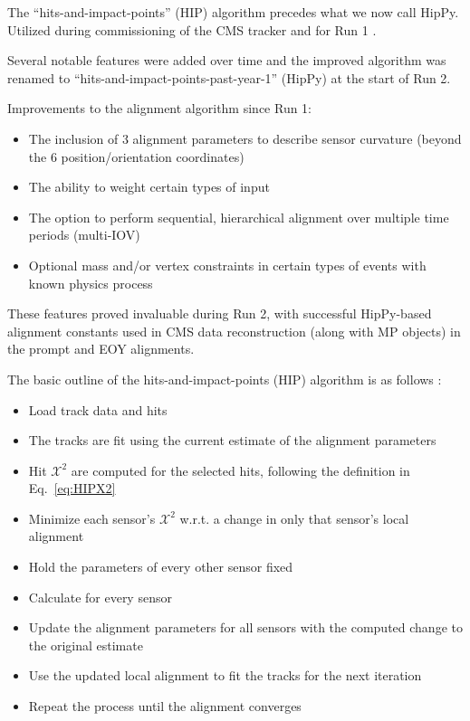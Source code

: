 The ``hits-and-impact-points'' (HIP) algorithm \cite{Karimaki:2003bd,Karimaki:926537} precedes what we now call HipPy.
Utilized during commissioning \cite{WAdam_2009} of the CMS tracker and for Run 1 \cite{CMSCollaboration_2010,Chatrchyan:1667597}.

Several notable features were added over time \cite{BROWN2009467} and the improved algorithm was renamed to “hits-and-impact-points-past-year-1” (HipPy) at the start of Run 2. 

Improvements to the alignment algorithm since Run 1:
\begin{itemize}
    \item The inclusion of 3 alignment parameters to describe sensor curvature (beyond the 6 position/orientation coordinates)
    \item The ability to weight certain types of input
    \item The option to perform sequential, hierarchical alignment over multiple time periods (multi-IOV)
    \item Optional mass and/or vertex constraints in certain types of events with known physics process
\end{itemize}

These features proved invaluable during Run 2, with successful HipPy-based alignment constants used in CMS data reconstruction (along with MP objects) in the prompt and EOY alignments\cite{BROWN2009467}.

The basic outline of the hits-and-impact-points (HIP) algorithm is as follows \cite{BROWN2009467}:
\begin{itemize}
    \item Load track data and hits
    \item The tracks are fit using the current estimate of the alignment parameters
    \item Hit $\mathcal{X} ^2$ are computed for the selected hits, following the definition in Eq.~\ref{eq:HIPX2}
    \item Minimize each sensor’s $\mathcal{X} ^2$ w.r.t. a change in only that sensor’s local alignment
    \item Hold the parameters of every other sensor fixed
    \item Calculate for every sensor
    \item Update the alignment parameters for all sensors with the computed change to the original estimate
    \item Use the updated local alignment to fit the tracks for the next iteration
    \item Repeat the process until the alignment converges
\end{itemize}

